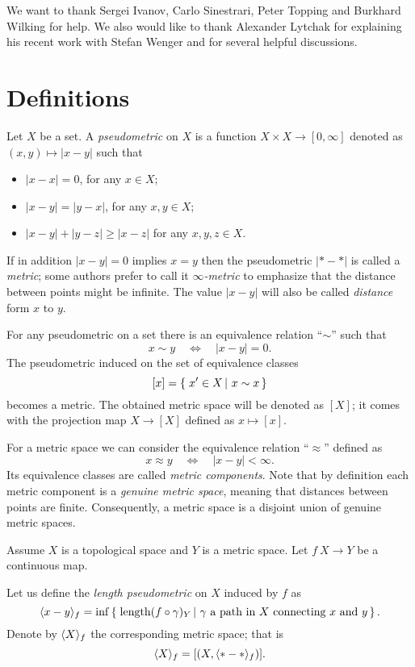 \documentclass{article}
\begin{document}
We want to thank 
Sergei Ivanov, 
Carlo Sinestrari, 
Peter Topping 
and Burkhard Wilking 
for help.
We also would like to thank Alexander Lytchak for explaining his recent work with Stefan Wenger and for several helpful discussions.


\section{Definitions}

Let $X$ be a set.
A \emph{pseudometric} on $X$ 
is a function $X\times X\to[0,\infty]$ denoted as $(x,y)\mapsto |x-y|$
such that 
\begin{itemize}
\item $|x-x|=0$, for any $x\in X$;
\item $|x-y|=|y-x|$, for any $x,y\in X$;
\item $|x-y|+|y-z|\ge|x-z|$ for any  $x,y,z\in X$.
\end{itemize}
If in addition $|x-y|=0$ implies $x=y$ then the pseudometric $|{*}-{*}|$ is called a \emph{metric}; some authors prefer to call it \emph{$\infty$-metric} to emphasize that the distance between points might be infinite.
The value $|x-y|$ will also be called \emph{distance} form $x$ to $y$.

For any pseudometric on a set there is an equivalence relation ``$\sim$'' such that 
\[x\sim y\quad\iff\quad|x-y|=0.\]
The pseudometric induced  on the set of equivalence classes 
\[[x]=\set{x'\in X}{x\sim x}\] becomes a metric.
The obtained metric space will be denoted as $[X]$;
it comes with the projection map $X\to [X]$ defined as $x\mapsto [x]$.


For a metric space we can consider the equivalence relation ``$\approx$'' defined as 
\[x\approx y\quad\iff\quad|x-y|<\infty.\]
Its equivalence classes are called \emph{metric components}.
Note that by definition each metric component is a \emph{genuine metric space}, meaning that distances between points are finite.
Consequently, a metric space is a disjoint union of genuine metric spaces.

Assume $X$ is a topological space and $Y$ is a metric space.
Let $f\:X\to Y$ be a continuous map. 

Let us define the \emph{length pseudometric} on $X$ induced by $f$ as
\[\< x-y\>_f
=
\inf
\set{\length(f\circ\gamma)_Y}{\gamma\ \text{a path in}\  X\ \text{connecting}\ x\ \text{and}\ y}.\]
Denote by $\langle X\rangle_f$ the corresponding metric space; that is 
\[\langle X\rangle_f=[(X,\langle{*}-{*}\rangle_f)].\] 
\end{document}
